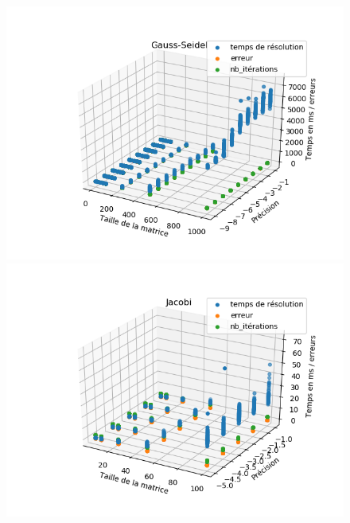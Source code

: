 
\begin{figure}[H]
	\begin{minipage}[t]{0.5\linewidth}
	\includegraphics[width=\linewidth]{../codes/Data/gauss-seidel3D.png}
	\end{minipage}
	\begin{minipage}[t]{0.5\linewidth}
	\includegraphics[width=\linewidth]{../codes/Data/jacobi3D.png}
	\end{minipage}
	\begin{minipage}[t]{0.5\linewidth}

\end{minipage}
\end{figure}
